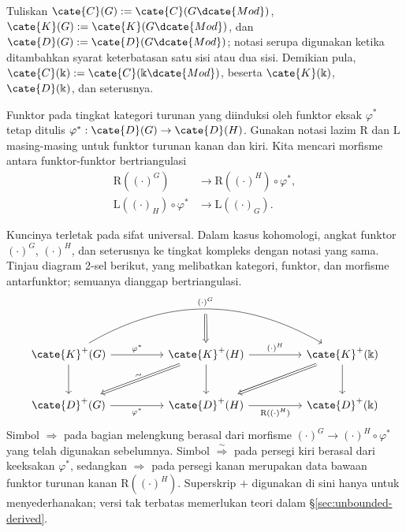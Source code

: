 \begin{convention}
	Tuliskan $\cate{C}(G):=\cate{C}(G\dcate{Mod})$,
	$\cate{K}(G):=\cate{K}(G\dcate{Mod})$, dan
	$\cate{D}(G):=\cate{D}(G\dcate{Mod})$; notasi serupa digunakan ketika
	ditambahkan syarat keterbatasan satu sisi atau dua sisi. Demikian pula,
	$\cate{C}(\Bbbk):=\cate{C}(\Bbbk\dcate{Mod})$, beserta
	$\cate{K}(\Bbbk)$, $\cate{D}(\Bbbk)$, dan seterusnya.
\end{convention}

Funktor pada tingkat kategori turunan yang diinduksi oleh funktor eksak
$\varphi^*$ tetap ditulis
$\varphi^*:\cate{D}(G)\to\cate{D}(H)$. Gunakan notasi lazim $\mathrm{R}$ dan
$\mathrm{L}$ masing-masing untuk funktor turunan kanan dan kiri. Kita mencari
morfisme antara funktor-funktor bertriangulasi
\begin{align*}
	\mathrm{R}\left( (\cdot)^G \right) & \to \mathrm{R}\left( (\cdot)^H \right) \circ \varphi^* , \\
	\mathrm{L}\left( (\cdot)_H \right) \circ \varphi^* & \to \mathrm{L}\left((\cdot)_G \right).
\end{align*}

Kuncinya terletak pada sifat universal. Dalam kasus kohomologi, angkat funktor
$(\cdot)^G$, $(\cdot)^H$, dan seterusnya ke tingkat kompleks dengan notasi
yang sama. Tinjau diagram 2-sel berikut, yang melibatkan kategori, funktor, dan
morfisme antarfunktor; semuanya dianggap bertriangulasi.
\begin{equation}\label{eqn:grp-pullback-2-cell}
	\begin{tikzcd}[column sep=huge, row sep=large]
		\cate{K}^+(G) \arrow[d] \arrow[r, "{\varphi^*}"] \arrow[rr, bend left, "{(\cdot)^G}", "{}"' {name=U}] & \cate{K}^+(H) \arrow[d] \arrow[r, "{(\cdot)^H}"] \arrow[from=U, Rightarrow] \arrow[Rightarrow, ld, "\sim" sloped] & \cate{K}^+(\Bbbk) \arrow[d] \arrow[Rightarrow, ld] \\
		\cate{D}^+(G) \arrow[r, "{\varphi^*}"'] & \cate{D}^+(H) \arrow[r, "{\mathrm{R}((\cdot)^H)}"'] & \cate{D}^+(\Bbbk)
	\end{tikzcd}
\end{equation}
Simbol $\Rightarrow$ pada bagian melengkung berasal dari morfisme
$(\cdot)^G\to(\cdot)^H\circ\varphi^*$ yang telah digunakan sebelumnya.
Simbol $\stackrel{\sim}{\Rightarrow}$ pada persegi kiri berasal dari keeksakan
$\varphi^*$, sedangkan $\Rightarrow$ pada persegi kanan merupakan data bawaan
funktor turunan kanan $\mathrm{R}((\cdot)^H)$. Superskrip $+$ digunakan di sini
hanya untuk menyederhanakan; versi tak terbatas memerlukan teori dalam
\S\ref{sec:unbounded-derived}.

